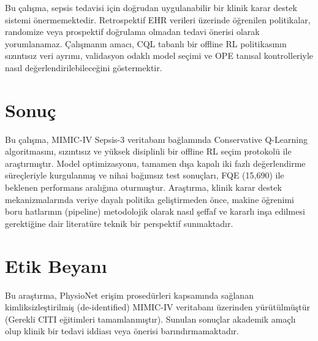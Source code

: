 \documentclass[11pt,a4paper]{article}
\begin{document}
Bu çalışma, sepsis tedavisi için doğrudan uygulanabilir bir klinik karar destek sistemi önermemektedir. Retrospektif EHR verileri üzerinde öğrenilen politikalar, randomize veya prospektif doğrulama olmadan tedavi önerisi olarak yorumlanamaz. Çalışmanın amacı, CQL tabanlı bir offline RL politikasının sızıntısız veri ayrımı, validasyon odaklı model seçimi ve OPE tanısal kontrolleriyle nasıl değerlendirilebileceğini göstermektir.

\section{Sonuç}

Bu çalışma, MIMIC-IV Sepsis-3 veritabanı bağlamında Conservative Q-Learning algoritmasını, sızıntısız ve yüksek disiplinli bir offline RL seçim protokolü ile araştırmıştır. Model optimizasyonu, tamamen dışa kapalı iki fazlı değerlendirme süreçleriyle kurgulanmış ve nihai bağımsız test sonuçları, FQE (15,690) ile beklenen performans aralığına oturmuştur. Araştırma, klinik karar destek mekanizmalarında veriye dayalı politika geliştirmeden önce, makine öğrenimi boru hatlarının (pipeline) metodolojik olarak nasıl şeffaf ve kararlı inşa edilmesi gerektiğine dair literatüre teknik bir perspektif sunmaktadır.

\section*{Etik Beyanı}
Bu araştırma, PhysioNet erişim prosedürleri kapsamında sağlanan kimliksizleştirilmiş (de-identified) MIMIC-IV veritabanı üzerinden yürütülmüştür (Gerekli CITI eğitimleri tamamlanmıştır). Sunulan sonuçlar akademik amaçlı olup klinik bir tedavi iddiası veya önerisi barındırmamaktadır.



\end{document}
